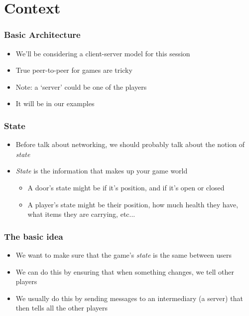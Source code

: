 \documentclass{beamer}
\begin{document}
	\section{Context}
	
	\begin{frame}
		\frametitle{Basic Architecture}
		
		\begin{itemize}
			\item We'll be considering a client-server model for this session
			\item True peer-to-peer for games are tricky
			\item Note: a `server' could be one of the players
			\item It will be in our examples
		\end{itemize}
	
	\end{frame}

	\begin{frame}
		\frametitle{State}
		
		\begin{itemize}
			\item Before talk about networking, we should probably talk about the notion of \textit{state}
			\item \textit{State} is the information that makes up your game world \begin{itemize}
				\item A door's state might be if it's position, and if it's open or closed
				\item A player's state might be their position, how much health they have, what items they are carrying, etc...
			\end{itemize}
		\end{itemize}
	\end{frame}

	\begin{frame}
		\frametitle{The basic idea}
		
		\begin{itemize}
			\item We want to make sure that the game's \textit{state} is the same between users
			\item We can do this by ensuring that when something changes, we tell other players
			\item We usually do this by sending messages to an intermediary (a server) that then tells all the other players
		\end{itemize}
	
	\end{frame}
\end{document}

